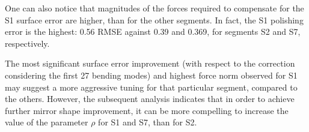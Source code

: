 \documentclass{gmto}
\begin{document}
One can also notice that magnitudes of the forces required to compensate for the \textsf{S1} surface error are higher, than for the other segments. In fact, the \textsf{S1} polishing error is the highest: \SI{0.56}{\micron} RMSE against \SI{0.39}{\micron} and \SI{0.369}{\micron}, for segments \textsf{S2} and \textsf{S7}, respectively.


The most significant surface error improvement (with respect to the correction considering the first 27 bending modes) and highest force norm observed for \textsf{S1} may suggest a more aggressive tuning for that particular segment, compared to the others. However, the subsequent analysis indicates that in order to achieve further mirror shape improvement, it can be more compelling to increase the value of the parameter $\rho$ for \textsf{S1} and \textsf{S7}, than for \textsf{S2}.
\end{document}
